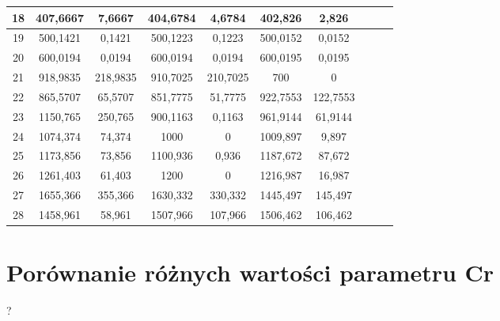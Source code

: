 \documentclass[a4paper,12pt]{article}
\theoremstyle{definition}
\begin{document}
\begin{table}[H]
\begin{tabular}{|c|c|c|c|c|c|c|c|c|c|}
    18    & 407,6667 & 7,6667 & 404,6784 & 4,6784 & 402,826 & 2,826 \\\hline
    19    & 500,1421 & 0,1421 & 500,1223 & 0,1223 & 500,0152 & 0,0152 \\\hline
    20    & 600,0194 & 0,0194 & 600,0194 & 0,0194 & 600,0195 & 0,0195 \\\hline
    21    & 918,9835 & 218,9835 & 910,7025 & 210,7025 & 700   & 0 \\\hline
    22    & 865,5707 & 65,5707 & 851,7775 & 51,7775 & 922,7553 & 122,7553 \\\hline
    23    & 1150,765 & 250,765 & 900,1163 & 0,1163 & 961,9144 & 61,9144 \\\hline
    24    & 1074,374 & 74,374 & 1000  & 0     & 1009,897 & 9,897 \\\hline
    25    & 1173,856 & 73,856 & 1100,936 & 0,936 & 1187,672 & 87,672 \\\hline
    26    & 1261,403 & 61,403 & 1200  & 0     & 1216,987 & 16,987 \\\hline
    27    & 1655,366 & 355,366 & 1630,332 & 330,332 & 1445,497 & 145,497 \\\hline
    28    & 1458,961 & 58,961 & 1507,966 & 107,966 & 1506,462 & 106,462 \\\hline
\end{tabular}	
\end{table}

\section{Porównanie różnych wartości parametru Cr}
?\\\\\\\\\\\\\\\\\\\\\\\\\\\\\\\\\\
\end{document}
